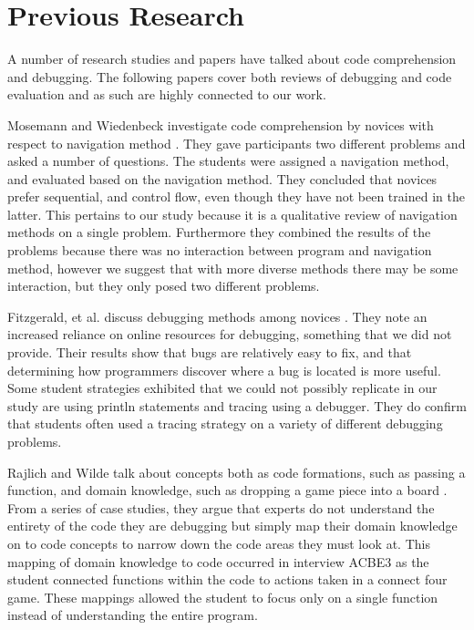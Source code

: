 \section{Previous Research}

A number of research studies and papers have talked about code comprehension and debugging. The following papers cover both reviews of debugging and code evaluation and as such are highly connected to our work. 

Mosemann and Wiedenbeck investigate code comprehension by novices with respect to navigation method \cite{mosemann2001}.
They gave participants two different problems and asked a number of questions.
The students were assigned a navigation method, and evaluated based on the navigation method.
They concluded that novices prefer sequential, and control flow, even though they have not been trained in the latter.
This pertains to our study because it is a qualitative review of navigation methods on a single problem.
Furthermore they combined the results of the problems because there was no interaction between program and navigation method,
	however we suggest that with more diverse methods there may be some interaction, but they only posed two different problems.
	
Fitzgerald, et al. discuss debugging methods among novices \cite{fitzgerald2008}.
They note an increased reliance on online resources for debugging, something that we did not provide.
Their results show that bugs are relatively easy to fix, and that determining how programmers discover where a bug is located is more useful.
Some student strategies exhibited that we could not possibly replicate in our study are using println statements and tracing using a debugger.
They do confirm that students often used a tracing strategy on a variety of different debugging problems.

Rajlich and Wilde talk about concepts both as code formations, such as passing a function, and domain knowledge, such as dropping a game piece into a board \cite{1021348}.
From a series of case studies, they argue that experts do not understand the entirety of the code they are debugging but simply map their domain knowledge on to code concepts to narrow down the code areas they must look at.
This mapping of domain knowledge to code occurred in interview ACBE3 as the student connected functions within the code to actions taken in a connect four game.
These mappings allowed the student to focus only on a single function instead of understanding the entire program.

